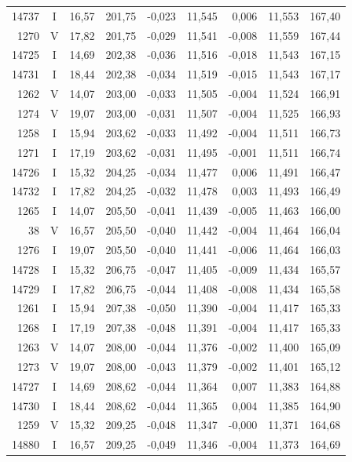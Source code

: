 \documentclass[11pt,a4paper]{article}
\begin{document}
{\begin{longtable}{rcrrrrrrr}
14737 & I & 16,57 & 201,75 & -0,023 & 11,545 & 0,006 & 11,553 & 167,40 \\
1270 & V & 17,82 & 201,75 & -0,029 & 11,541 & -0,008 & 11,559 & 167,44 \\
14725 & I & 14,69 & 202,38 & -0,036 & 11,516 & -0,018 & 11,543 & 167,15 \\
14731 & I & 18,44 & 202,38 & -0,034 & 11,519 & -0,015 & 11,543 & 167,17 \\
1262 & V & 14,07 & 203,00 & -0,033 & 11,505 & -0,004 & 11,524 & 166,91 \\
1274 & V & 19,07 & 203,00 & -0,031 & 11,507 & -0,004 & 11,525 & 166,93 \\
1258 & I & 15,94 & 203,62 & -0,033 & 11,492 & -0,004 & 11,511 & 166,73 \\
1271 & I & 17,19 & 203,62 & -0,031 & 11,495 & -0,001 & 11,511 & 166,74 \\
14726 & I & 15,32 & 204,25 & -0,034 & 11,477 & 0,006 & 11,491 & 166,47 \\
14732 & I & 17,82 & 204,25 & -0,032 & 11,478 & 0,003 & 11,493 & 166,49 \\
1265 & I & 14,07 & 205,50 & -0,041 & 11,439 & -0,005 & 11,463 & 166,00 \\
\rowcolor{yellow!25} 38 & V & 16,57 & 205,50 & -0,040 & 11,442 & -0,004 & 11,464 & 166,04 \\
1276 & I & 19,07 & 205,50 & -0,040 & 11,441 & -0,006 & 11,464 & 166,03 \\
14728 & I & 15,32 & 206,75 & -0,047 & 11,405 & -0,009 & 11,434 & 165,57 \\
14729 & I & 17,82 & 206,75 & -0,044 & 11,408 & -0,008 & 11,434 & 165,58 \\
1261 & I & 15,94 & 207,38 & -0,050 & 11,390 & -0,004 & 11,417 & 165,33 \\
1268 & I & 17,19 & 207,38 & -0,048 & 11,391 & -0,004 & 11,417 & 165,33 \\
1263 & V & 14,07 & 208,00 & -0,044 & 11,376 & -0,002 & 11,400 & 165,09 \\
1273 & V & 19,07 & 208,00 & -0,043 & 11,379 & -0,002 & 11,401 & 165,12 \\
14727 & I & 14,69 & 208,62 & -0,044 & 11,364 & 0,007 & 11,383 & 164,88 \\
14730 & I & 18,44 & 208,62 & -0,044 & 11,365 & 0,004 & 11,385 & 164,90 \\
1259 & V & 15,32 & 209,25 & -0,048 & 11,347 & -0,000 & 11,371 & 164,68 \\
14880 & I & 16,57 & 209,25 & -0,049 & 11,346 & -0,004 & 11,373 & 164,69 \\

\end{longtable}}
\end{document}

